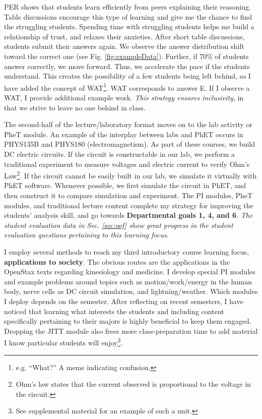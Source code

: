 \documentclass[../../../main.tex]{subfiles}
\begin{document}
PER shows that students learn efficiently from peers explaining their reasoning.  Table discussions encourage this type of learning and  give me the chance to find the struggling students. Spending time with struggling students helps me build a relationship of trust, and relaxes their anxieties.  After short table discussions, students submit their answers again.  We observe the answer distribution shift toward the correct one (see Fig. \ref{fig:exampleData}).  Further, if 70\% of students answer correctly, we move forward.  Thus, we accelerate the pace if the students understand.  This creates the possibility of a few students being left behind, so I have added the concept of WAT\footnote{e.g. ``What?'' A meme indicating confusion.}.  WAT corresponds to answer E.  If I observe a WAT, I provide additional example work.  \textit{This strategy ensures inclusivity}, in that we strive to leave no one behind in class.  \\ \hspace{0.1cm}

The second-half of the lecture/laboratory format moves on to the lab activity or PheT module.  An example of the interplay between  labs and PhET occurs in PHYS135B and PHYS180 (electromagnetism).  As part of these courses, we build DC electric circuits.  If the circuit is constructable in our lab, we perform a traditional experiment to measure voltages and electric current to verify Ohm's Law\footnote{Ohm's law states that the current observed is proportional to the voltage in the circuit.}.  If the circuit cannot be easily built in our lab, we simulate it virtually with PhET software.  Whenever possible, we first simulate the circuit in PhET, and then construct it to compare simulation and experiment.  The PI modules, PheT modules, and traditional lecture content complete my strategy for improving the students' analysis skill, and go towards \textbf{Departmental goals 1, 4, and 6}.  \textit{The student evaluation data in Sec. \ref{sec:oof} show great progress in the student evaluation questions pertaining to this learning focus.} \\ \hspace{0.1cm}

I employ several methods to reach my third introductory course learning focus, \textbf{applications to society}.  The obvious routes are the applications in the OpenStax texts \cite{openstax1} regarding kinesiology and medicine.  I develop special PI modules and example problems around topics such as motion/work/energy in the human body, nerve cells as DC circuit simulation, and lightning/weather.  Which modules I deploy depends on the semester.  After reflecting on recent semesters, I have noticed that learning what interests the students and including content specifically pertaining to their majors is highly beneficial to keep them engaged.  Dropping the JITT module also frees more class-preparation time to add material I know particular students will enjoy\footnote{See supplemental material for an example of such a unit.}. \\ \hspace{0.1cm}
\end{document}
